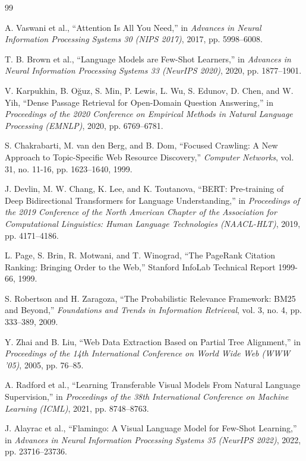 \documentclass[conference]{IEEEtran}
\begin{document}
\begin{thebibliography}{99}

A. Vaswani et al., ``Attention Is All You Need,'' in \textit{Advances in Neural Information Processing Systems 30 (NIPS 2017)}, 2017, pp. 5998--6008.

T. B. Brown et al., ``Language Models are Few-Shot Learners,'' in \textit{Advances in Neural Information Processing Systems 33 (NeurIPS 2020)}, 2020, pp. 1877--1901.

V. Karpukhin, B. O\u{g}uz, S. Min, P. Lewis, L. Wu, S. Edunov, D. Chen, and W. Yih, ``Dense Passage Retrieval for Open-Domain Question Answering,'' in \textit{Proceedings of the 2020 Conference on Empirical Methods in Natural Language Processing (EMNLP)}, 2020, pp. 6769--6781.

S. Chakrabarti, M. van den Berg, and B. Dom, ``Focused Crawling: A New Approach to Topic-Specific Web Resource Discovery,'' \textit{Computer Networks}, vol. 31, no. 11-16, pp. 1623--1640, 1999.

J. Devlin, M. W. Chang, K. Lee, and K. Toutanova, ``BERT: Pre-training of Deep Bidirectional Transformers for Language Understanding,'' in \textit{Proceedings of the 2019 Conference of the North American Chapter of the Association for Computational Linguistics: Human Language Technologies (NAACL-HLT)}, 2019, pp. 4171--4186.

L. Page, S. Brin, R. Motwani, and T. Winograd, ``The PageRank Citation Ranking: Bringing Order to the Web,'' Stanford InfoLab Technical Report 1999-66, 1999.

S. Robertson and H. Zaragoza, ``The Probabilistic Relevance Framework: BM25 and Beyond,'' \textit{Foundations and Trends in Information Retrieval}, vol. 3, no. 4, pp. 333--389, 2009.

Y. Zhai and B. Liu, ``Web Data Extraction Based on Partial Tree Alignment,'' in \textit{Proceedings of the 14th International Conference on World Wide Web (WWW '05)}, 2005, pp. 76--85.

A. Radford et al., ``Learning Transferable Visual Models From Natural Language Supervision,'' in \textit{Proceedings of the 38th International Conference on Machine Learning (ICML)}, 2021, pp. 8748--8763.

J. Alayrac et al., ``Flamingo: A Visual Language Model for Few-Shot Learning,'' in \textit{Advances in Neural Information Processing Systems 35 (NeurIPS 2022)}, 2022, pp. 23716--23736.


\end{thebibliography}
\end{document}
